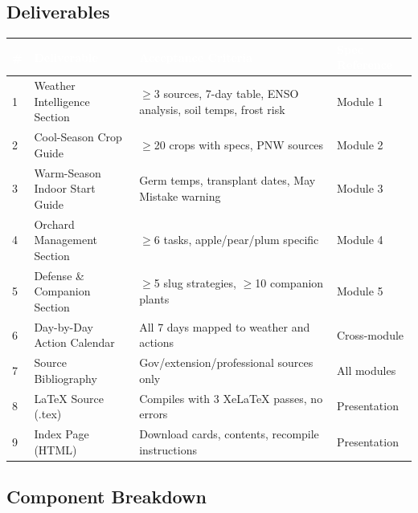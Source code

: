 \documentclass[11pt,letterpaper]{article}
\newcommand{\tableheader}[1]{\textbf{\sffamily\textcolor{white}{#1}}}
\begin{document}
\subsection{Deliverables}

\begin{center}
\begin{tabularx}{\textwidth}{C{0.5cm}L{3.5cm}X L{2.5cm}}
\toprule
{}
\tableheader{\#} & \tableheader{Deliverable} & \tableheader{Acceptance Criteria} & \tableheader{Spec Reference} \\
 & Weather Intelligence Section & $\geq$3 sources, 7-day table, ENSO analysis, soil temps, frost risk & Module 1 \\
2 & Cool-Season Crop Guide & $\geq$20 crops with specs, PNW sources & Module 2 \\
3 & Warm-Season Indoor Start Guide & Germ temps, transplant dates, May Mistake warning & Module 3 \\
4 & Orchard Management Section & $\geq$6 tasks, apple/pear/plum specific & Module 4 \\
5 & Defense \& Companion Section & $\geq$5 slug strategies, $\geq$10 companion plants & Module 5 \\
6 & Day-by-Day Action Calendar & All 7 days mapped to weather and actions & Cross-module \\
7 & Source Bibliography & Gov/extension/professional sources only & All modules \\
8 & LaTeX Source (.tex) & Compiles with 3 XeLaTeX passes, no errors & Presentation \\
9 & Index Page (HTML) & Download cards, contents, recompile instructions & Presentation \\
\bottomrule
\end{tabularx}
\end{center}

\subsection{Component Breakdown}
\end{document}
